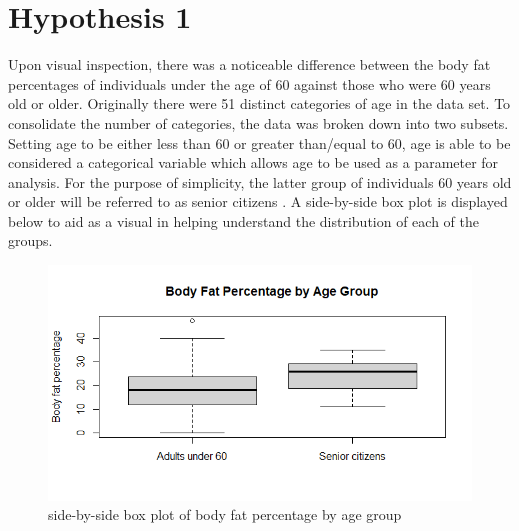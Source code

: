 \documentclass[12pt]{article}
\begin{document}
\section*{Hypothesis 1}

Upon visual inspection, there was a noticeable difference between the body fat percentages of individuals under the age of 60 against those who were 60 years old or older.  Originally there were 51 distinct categories of age in the data set. To consolidate the number of categories, the data was broken down into two subsets.  Setting age to be either less than 60 or greater than/equal to 60, age is able to be considered a categorical variable which allows age to be used as a parameter for analysis. For the purpose of simplicity, the latter group of individuals 60 years old or older will be referred to as senior citizens \cite{paper}.  A side-by-side box plot is displayed below to aid as a visual in helping understand the distribution of each of the groups. 


\begin{figure}[h]
\centering
\includegraphics[width = 125mm]{agegroupbfpboxplot.png}
\caption{side-by-side box plot of body fat percentage by age group}
\label{side-by-side boxplot}
\end{figure}
\end{document}

